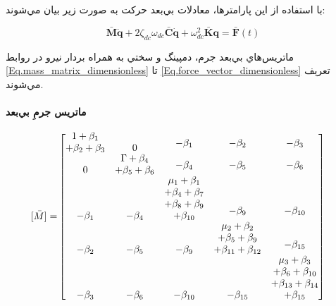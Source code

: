 با استفاده از اين پارامترها، معادلات بي‌بعد حركت به صورت زير بيان مي‌شوند:

\begin{equation}\label{Eq.EOM_dimensionless}
\mathbf{\bar{M}} \ddot{\mathbf{q}} + 2 \zeta_{dc} \omega_{dc} \mathbf{\bar{C}} \dot{\mathbf{q}} + \omega_{dc}^2 \mathbf{\bar{K}} \mathbf{q} = \mathbf{\bar{F}}(t)
\end{equation}

ماتريس‌هاي بي‌بعد جرم، دمپينگ و سختي به همراه بردار نيرو در روابط \eqref{Eq.mass_matrix_dimensionless} تا \eqref{Eq.force_vector_dimensionless} تعريف مي‌شوند.

\paragraph{ماتريس جرمِ بي‌بعد}

\begin{equation}\label{Eq.mass_matrix_dimensionless}
\begin{aligned}
[\bar{M}] =& 
\begin{bmatrix}
\shortstack{$1 + \beta_1$ \\ $+ \beta_2 + \beta_3$} & 0 & \shortstack{$-\beta_1$ \\ \,} & \shortstack{$-\beta_2$ \\ \,} & \shortstack{$-\beta_3$ \\ \,} \\
0 & \shortstack{$\Gamma + \beta_4$ \\ $+ \beta_5 + \beta_6$} & \shortstack{$-\beta_4$ \\ \,} & \shortstack{$-\beta_5$ \\ \,} & \shortstack{$-\beta_6$ \\ \,} \\
-\beta_1 & -\beta_4 & \shortstack{$\mu_1 + \beta_1$ \\ $+ \beta_4 + \beta_7$ \\ $+ \beta_8 + \beta_9$ \\ $+ \beta_{10}$} & \shortstack{$-\beta_9$ \\ \,} & \shortstack{$-\beta_{10}$ \\ \,} \\
-\beta_2 & -\beta_5 & -\beta_9 & \shortstack{$\mu_2 + \beta_2$ \\ $+ \beta_5 + \beta_9$ \\ $+ \beta_{11} + \beta_{12}$} & \shortstack{$-\beta_{15}$ \\ \,} \\
-\beta_3 & -\beta_6 & -\beta_{10} & -\beta_{15} & \shortstack{$\mu_3 + \beta_3$ \\ $+ \beta_6 + \beta_{10}$ \\ $+ \beta_{13} + \beta_{14}$ \\ $+ \beta_{15}$}
\end{bmatrix}
\end{aligned}
\end{equation}

